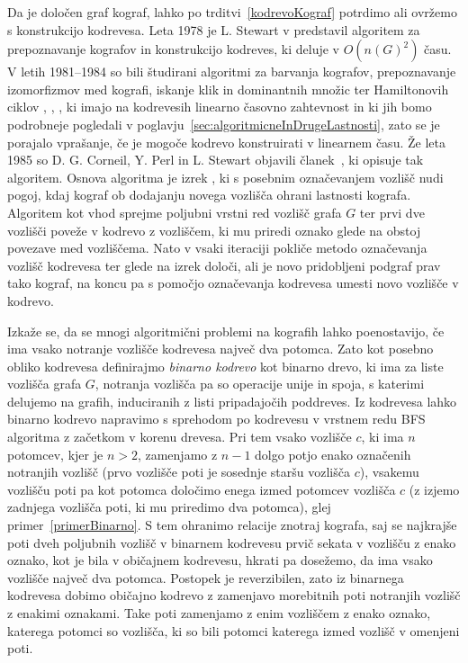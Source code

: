\documentclass[12pt,a4paper,twoside]{article}
\theoremstyle{definition} %
\theoremstyle{plain} %
\numberwithin{equation}{section}  %
\begin{document}
Da je določen graf kograf, lahko po trditvi~\ref{kodrevoKograf} potrdimo ali ovržemo s konstrukcijo kodrevesa. Leta 1978 je L. Stewart v \cite{stewart1978cographs} predstavil algoritem za prepoznavanje kografov in konstrukcijo kodreves, ki deluje v $O(n(G)^2)$ času. V letih 1981--1984 so bili študirani algoritmi za barvanja kografov, prepoznavanje izomorfizmov med kografi, iskanje klik in dominantnih množic ter Hamiltonovih ciklov \cite{corneil1981complement}, \cite{corneil1984clustering}, \cite{corneil1984cographs}, ki imajo na kodrevesih linearno časovno zahtevnost in ki jih bomo podrobneje pogledali v poglavju~\ref{sec:algoritmicneInDrugeLastnosti}, zato se je porajalo vprašanje, če je mogoče kodrevo konstruirati v linearnem času. Že leta 1985 so D. G. Corneil, Y. Perl in L. Stewart objavili članek~\cite{corneil1985linear}, ki opisuje tak algoritem. Osnova algoritma je izrek \cite[Theorem 1]{corneil1985linear}, ki s posebnim označevanjem vozlišč nudi pogoj, kdaj kograf ob dodajanju novega vozlišča ohrani lastnosti kografa. Algoritem \cite[Algorithm Cograph-recognition]{corneil1985linear} kot vhod sprejme poljubni vrstni red vozlišč grafa $G$ ter prvi dve vozlišči poveže v kodrevo z vozliščem, ki mu priredi oznako glede na obstoj povezave med vozliščema. Nato v vsaki iteraciji pokliče metodo označevanja vozlišč kodrevesa ter glede na izrek \cite[Theorem 1]{corneil1985linear} določi, ali je novo pridobljeni podgraf prav tako kograf, na koncu pa s pomočjo označevanja kodrevesa umesti novo vozlišče v kodrevo.

\medskip
Izkaže se, da se mnogi algoritmični problemi na kografih lahko poenostavijo, če ima vsako notranje vozlišče kodrevesa največ dva potomca. Zato kot posebno obliko kodrevesa definirajmo \emph{binarno kodrevo} kot binarno drevo, ki ima za liste vozlišča grafa $G$, notranja vozlišča pa so operacije unije in spoja, s katerimi delujemo na grafih, induciranih z listi pripadajočih poddreves. Iz kodrevesa lahko binarno kodrevo napravimo s sprehodom po kodrevesu v vrstnem redu BFS algoritma z začetkom v korenu drevesa. Pri tem vsako vozlišče $c$, ki ima $n$ potomcev, kjer je $n > 2$, zamenjamo z $n-1$ dolgo potjo enako označenih notranjih vozlišč (prvo vozlišče poti je sosednje staršu vozlišča $c$), vsakemu vozlišču poti pa kot potomca določimo enega izmed potomcev vozlišča $c$ (z izjemo zadnjega vozlišča poti, ki mu priredimo dva potomca), glej primer~\ref{primerBinarno}. S tem ohranimo relacije znotraj kografa, saj se najkrajše poti dveh poljubnih vozlišč v binarnem kodrevesu prvič sekata v vozlišču z enako oznako, kot je bila v običajnem kodrevesu, hkrati pa dosežemo, da ima vsako vozlišče največ dva potomca. Postopek je reverzibilen, zato iz binarnega kodrevesa dobimo običajno kodrevo z zamenjavo morebitnih poti notranjih vozlišč z enakimi oznakami. Take poti zamenjamo z enim vozliščem z enako oznako, katerega potomci so vozlišča, ki so bili potomci katerega izmed vozlišč v omenjeni poti.
\end{document}
